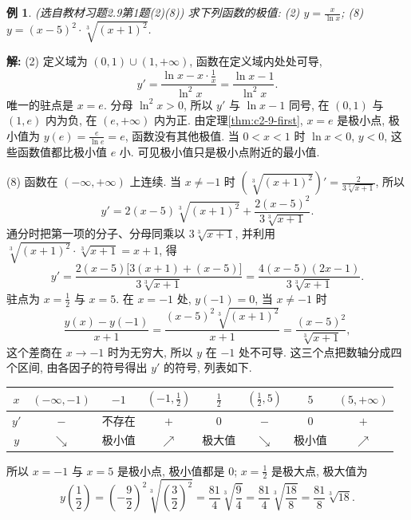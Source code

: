 \documentclass[UTF8,openany]{ctexbook}
\theoremstyle{chinesetextbook}
\newtheorem{example}{例}[section]
\newenvironment{cnsolution}{\par\indent\textbf{解:} \ignorespaces}{\par}
\begin{document}
\begin{example}\label{ex:c2-h9-1}
\textnormal{(选自教材习题2.9第1题(2)(8))} 求下列函数的极值: (2) $\displaystyle y=\frac x{\ln x}$; (8) $y=(x-5)^2\cdot\sqrt[3]{(x+1)^2}$.
\end{example}
\begin{cnsolution}
(2) 定义域为 $(0,1)\cup(1,+\infty)$, 函数在定义域内处处可导,
\[
y'=\frac{\ln x-x\cdot\frac1x}{\ln^2x}=\frac{\ln x-1}{\ln^2x}.
\]
唯一的驻点是 $x=e$. 分母 $\ln^2x>0$, 所以 $y'$ 与 $\ln x-1$ 同号, 在 $(0,1)$ 与 $(1,e)$ 内为负, 在 $(e,+\infty)$ 内为正. 由定理\ref{thm:c2-9-first}, $x=e$ 是极小点, 极小值为 $\displaystyle y(e)=\frac e{\ln e}=e$, 函数没有其他极值. 当 $0<x<1$ 时 $\ln x<0$, $y<0$, 这些函数值都比极小值 $e$ 小. 可见极小值只是极小点附近的最小值.

(8) 函数在 $(-\infty,+\infty)$ 上连续. 当 $x\ne-1$ 时 $\displaystyle\left(\sqrt[3]{(x+1)^2}\right)'=\frac2{3\sqrt[3]{x+1}}$, 所以
\[
y'=2(x-5)\sqrt[3]{(x+1)^2}+\frac{2(x-5)^2}{3\sqrt[3]{x+1}}.
\]
通分时把第一项的分子、分母同乘以 $3\sqrt[3]{x+1}$, 并利用 $\sqrt[3]{(x+1)^2}\cdot\sqrt[3]{x+1}=x+1$, 得
\[
y'=\frac{2(x-5)\bigl[3(x+1)+(x-5)\bigr]}{3\sqrt[3]{x+1}}=\frac{4(x-5)(2x-1)}{3\sqrt[3]{x+1}}.
\]
驻点为 $\displaystyle x=\frac12$ 与 $x=5$. 在 $x=-1$ 处, $y(-1)=0$, 当 $x\ne-1$ 时
\[
\frac{y(x)-y(-1)}{x+1}=\frac{(x-5)^2\sqrt[3]{(x+1)^2}}{x+1}=\frac{(x-5)^2}{\sqrt[3]{x+1}},
\]
这个差商在 $x\to-1$ 时为无穷大, 所以 $y$ 在 $-1$ 处不可导. 这三个点把数轴分成四个区间, 由各因子的符号得出 $y'$ 的符号, 列表如下.
\begin{center}
\renewcommand{\arraystretch}{1.6}
\begin{tabular}{c|c|c|c|c|c|c|c}
\hline
$x$ & $(-\infty,-1)$ & $-1$ & $\displaystyle\left(-1,\frac12\right)$ & $\displaystyle\frac12$ & $\displaystyle\left(\frac12,5\right)$ & $5$ & $(5,+\infty)$\\
\hline
$y'$ & $-$ & 不存在 & $+$ & $0$ & $-$ & $0$ & $+$\\
\hline
$y$ & $\searrow$ & 极小值 & $\nearrow$ & 极大值 & $\searrow$ & 极小值 & $\nearrow$\\
\hline
\end{tabular}
\end{center}
所以 $x=-1$ 与 $x=5$ 是极小点, 极小值都是 $0$; $\displaystyle x=\frac12$ 是极大点, 极大值为
\[
y\left(\frac12\right)=\left(-\frac92\right)^2\sqrt[3]{\left(\frac32\right)^2}=\frac{81}4\sqrt[3]{\frac94}=\frac{81}4\sqrt[3]{\frac{18}8}=\frac{81}8\sqrt[3]{18}.
\]
\end{cnsolution}
\end{document}
